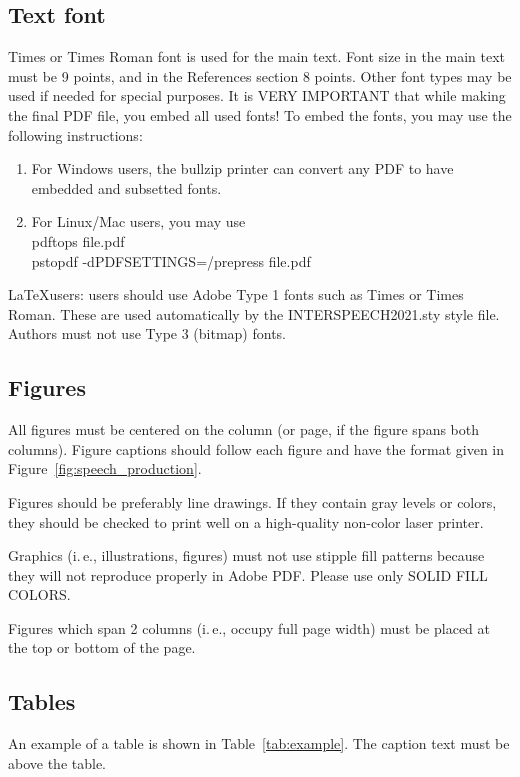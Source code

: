 \documentclass[a4paper]{article}
\begin{document}
\subsection{Text font}

Times or Times Roman font is used for the main text. Font size in the main text must be 9 points, and in the References section 8 points. Other font types may be used if needed for special purposes. It is VERY IMPORTANT that while making the final PDF file, you embed all used fonts! To embed the fonts, you may use the following instructions:
\begin{enumerate}
\item For Windows users, the bullzip printer can convert any PDF to have embedded and subsetted fonts.
\item For Linux/Mac users, you may use \\
   pdftops file.pdf\\
   pstopdf -dPDFSETTINGS=/prepress file.pdf
\end{enumerate}

\LaTeX users: users should use Adobe Type 1 fonts such as Times or Times Roman. These are used automatically by the INTERSPEECH2021.sty style file. Authors must not use Type 3 (bitmap) fonts.

\subsection{Figures}

All figures must be centered on the column (or page, if the figure spans both columns). Figure captions should follow each figure and have the format given in Figure~\ref{fig:speech_production}.

Figures should be preferably line drawings. If they contain gray levels or colors, they should be checked to print well on a high-quality non-color laser printer.

Graphics (i.\,e., illustrations, figures) must not use stipple fill patterns because they will not reproduce properly in Adobe PDF. Please use only SOLID FILL COLORS.

Figures which span 2 columns (i.\,e., occupy full page width) must be placed at the top or bottom of the page.

\subsection{Tables}

An example of a table is shown in Table~\ref{tab:example}. The caption text must be above the table.
\end{document}
